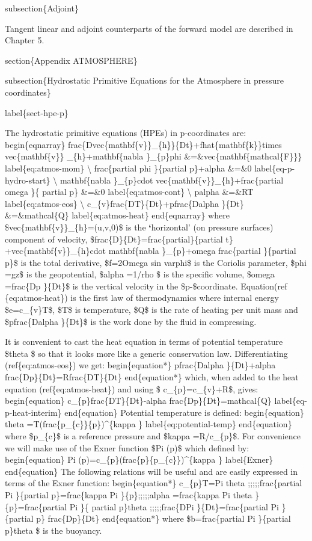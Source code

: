 \documentclass[letterpaper,10pt,english]{sphinxmanual}
\begin{document}
subsection\{Adjoint\}

Tangent linear and adjoint counterparts of the forward model are described
in Chapter 5.

section\{Appendix ATMOSPHERE\}

subsection\{Hydrostatic Primitive Equations for the Atmosphere in pressure
coordinates\}

label\{sect-hpe-p\}

The hydrostatic primitive equations (HPEs) in p-coordinates are:
begin\{eqnarray\}
frac\{Dvec\{mathbf\{v\}\}\_\{h\}\}\{Dt\}+fhat\{mathbf\{k\}\}times vec\{mathbf\{v\}\}
\_\{h\}+mathbf\{nabla \}\_\{p\}phi \&=\&vec\{mathbf\{mathcal\{F\}\}\}
label\{eq:atmos-mom\} \textbackslash{}
frac\{partial phi \}\{partial p\}+alpha \&=\&0  label\{eq-p-hydro-start\} \textbackslash{}
mathbf\{nabla \}\_\{p\}cdot vec\{mathbf\{v\}\}\_\{h\}+frac\{partial omega \}\{
partial p\} \&=\&0  label\{eq:atmos-cont\} \textbackslash{}
palpha \&=\&RT  label\{eq:atmos-eos\} \textbackslash{}
c\_\{v\}frac\{DT\}\{Dt\}+pfrac\{Dalpha \}\{Dt\} \&=\&mathcal\{Q\}  label\{eq:atmos-heat\}
end\{eqnarray\}
where \$vec\{mathbf\{v\}\}\_\{h\}=(u,v,0)\$ is the {\color{red}\bfseries{}{}`}horizontal' (on pressure
surfaces) component of velocity, \$frac\{D\}\{Dt\}=frac\{partial\}\{partial t\}
+vec\{mathbf\{v\}\}\_\{h\}cdot mathbf\{nabla \}\_\{p\}+omega frac\{partial \}\{partial p\}\$
is the total derivative, \$f=2Omega sin varphi\$ is the Coriolis parameter,
\$phi =gz\$ is the geopotential, \$alpha =1/rho \$ is the specific volume,
\$omega =frac\{Dp \}\{Dt\}\$ is the vertical velocity in the \$p-\$coordinate.
Equation(ref \{eq:atmos-heat\}) is the first law of thermodynamics where internal
energy \$e=c\_\{v\}T\$, \$T\$ is temperature, \$Q\$ is the rate of heating per unit mass
and \$pfrac\{Dalpha \}\{Dt\}\$ is the work done by the fluid in compressing.

It is convenient to cast the heat equation in terms of potential temperature
\$theta \$ so that it looks more like a generic conservation law.
Differentiating (ref\{eq:atmos-eos\}) we get:
begin\{equation*\}
pfrac\{Dalpha \}\{Dt\}+alpha frac\{Dp\}\{Dt\}=Rfrac\{DT\}\{Dt\}
end\{equation*\}
which, when added to the heat equation (ref\{eq:atmos-heat\}) and using \$
c\_\{p\}=c\_\{v\}+R\$, gives:
begin\{equation\}
c\_\{p\}frac\{DT\}\{Dt\}-alpha frac\{Dp\}\{Dt\}=mathcal\{Q\}
label\{eq-p-heat-interim\}
end\{equation\}
Potential temperature is defined:
begin\{equation\}
theta =T(frac\{p\_\{c\}\}\{p\})\textasciicircum{}\{kappa \}  label\{eq:potential-temp\}
end\{equation\}
where \$p\_\{c\}\$ is a reference pressure and \$kappa =R/c\_\{p\}\$. For convenience
we will make use of the Exner function \$Pi (p)\$ which defined by:
begin\{equation\}
Pi (p)=c\_\{p\}(frac\{p\}\{p\_\{c\}\})\textasciicircum{}\{kappa \}  label\{Exner\}
end\{equation\}
The following relations will be useful and are easily expressed in terms of
the Exner function:
begin\{equation*\}
c\_\{p\}T=Pi theta ;;;;;frac\{partial Pi \}\{partial p\}=frac\{kappa Pi
\}\{p\};;;;;alpha =frac\{kappa Pi theta \}\{p\}=frac\{partial Pi \}\{
partial p\}theta ;;;;;frac\{DPi \}\{Dt\}=frac\{partial Pi \}\{partial p\}
frac\{Dp\}\{Dt\}
end\{equation*\}
where \$b=frac\{partial Pi \}\{partial p\}theta \$ is the buoyancy.
\end{document}
